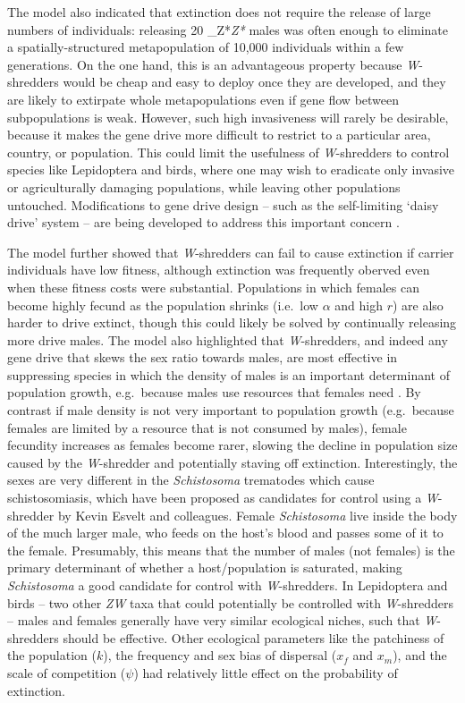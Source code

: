 \documentclass[]{rsos}%
\begin{document}
The model also indicated that extinction does not require the release of
large numbers of individuals: releasing 20 \_Z*\emph{Z*} males was often
enough to eliminate a spatially-structured metapopulation of 10,000
individuals within a few generations. On the one hand, this is an
advantageous property because \emph{W}-shredders would be cheap and easy
to deploy once they are developed, and they are likely to extirpate
whole metapopulations even if gene flow between subpopulations is weak.
However, such high invasiveness will rarely be desirable, because it
makes the gene drive more difficult to restrict to a particular area,
country, or population. This could limit the usefulness of
\emph{W}-shredders to control species like Lepidoptera and birds, where
one may wish to eradicate only invasive or agriculturally damaging
populations, while leaving other populations untouched. Modifications to
gene drive design -- such as the self-limiting `daisy drive' system --
are being developed to address this important concern
\citep{min2017da, noble2019da}.

The model further showed that \emph{W}-shredders can fail to cause
extinction if carrier individuals have low fitness, although extinction
was frequently oberved even when these fitness costs were substantial.
Populations in which females can become highly fecund as the population
shrinks (i.e.~low \(\alpha\) and high \(r\)) are also harder to drive
extinct, though this could likely be solved by continually releasing
more drive males. The model also highlighted that \emph{W}-shredders,
and indeed any gene drive that skews the sex ratio towards males, are
most effective in suppressing species in which the density of males is
an important determinant of population growth, e.g.~because males use
resources that females need \citep{li2019int}. By contrast if male
density is not very important to population growth (e.g.~because females
are limited by a resource that is not consumed by males), female
fecundity increases as females become rarer, slowing the decline in
population size caused by the \emph{W}-shredder and potentially staving
off extinction. Interestingly, the sexes are very different in the
\emph{Schistosoma} trematodes which cause schistosomiasis, which have
been proposed as candidates for control using a \emph{W}-shredder by
Kevin Esvelt and colleagues. Female \emph{Schistosoma} live inside the
body of the much larger male, who feeds on the host's blood and passes
some of it to the female. Presumably, this means that the number of
males (not females) is the primary determinant of whether a
host/population is saturated, making \emph{Schistosoma} a good candidate
for control with \emph{W}-shredders. In Lepidoptera and birds -- two
other \emph{ZW} taxa that could potentially be controlled with
\emph{W}-shredders -- males and females generally have very similar
ecological niches, such that \emph{W}-shredders should be effective.
Other ecological parameters like the patchiness of the population
(\(k\)), the frequency and sex bias of dispersal (\(x_f\) and \(x_m\)),
and the scale of competition (\(\psi\)) had relatively little effect on
the probability of extinction.
\end{document}
